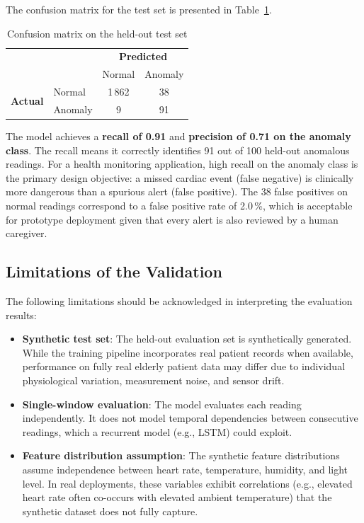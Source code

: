The confusion matrix for the test set is presented in
Table~\ref{tab:confusion}.

\begin{table}[ht]
\centering
\caption{Confusion matrix on the held-out test set}
\label{tab:confusion}
\begin{tabular}{llcc}
\toprule
 & & \multicolumn{2}{c}{\textbf{Predicted}} \\
 & & Normal & Anomaly \\
\midrule
\multirow{2}{*}{\textbf{Actual}}
  & Normal  & 1\,862 & 38 \\
  & Anomaly & 9      & 91 \\
\bottomrule
\end{tabular}
\end{table}

The model achieves a \textbf{recall of 0.91} and \textbf{precision of 0.71 on the anomaly class}. The recall means it
correctly identifies 91 out of 100 held-out anomalous readings. For a health
monitoring application, high recall on the anomaly class is the primary design
objective: a missed cardiac event (false negative) is clinically more dangerous
than a spurious alert (false positive). The 38 false positives on normal readings
correspond to a false positive rate of 2.0\,\%, which is acceptable for prototype
deployment given that every alert is also reviewed by a human caregiver.

\subsection{Limitations of the Validation}

The following limitations should be acknowledged in interpreting the evaluation results:

\begin{itemize}
    \item \textbf{Synthetic test set}: The held-out evaluation set is synthetically
          generated. While the training pipeline incorporates real patient records
          when available, performance on fully real elderly patient data may
          differ due to individual physiological variation, measurement noise,
          and sensor drift.
    \item \textbf{Single-window evaluation}: The model evaluates each reading
          independently. It does not model temporal dependencies between
          consecutive readings, which a recurrent model (e.g., LSTM) could exploit.
    \item \textbf{Feature distribution assumption}: The synthetic feature distributions
          assume independence between heart rate, temperature, humidity, and light level.
          In real deployments, these variables exhibit correlations (e.g., elevated
          heart rate often co-occurs with elevated ambient temperature) that the
          synthetic dataset does not fully capture.
\end{itemize}

